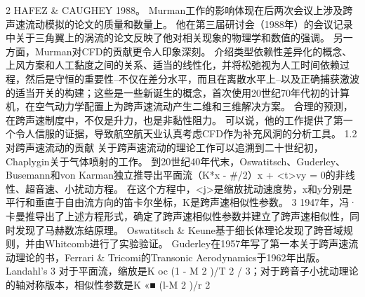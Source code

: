\documentclass[UTF8,11pt,a4paper,openany,fontset=fandol]{ctexbook}
\begin{document}
2 HAFEZ \& CAUGHEY 1988。 Murman工作的影响体现在后两次会议上涉及跨声速流动模拟的论文的质量和数量上。 他在第三届研讨会（1988年）的会议记录中关于三角翼上的涡流的论文反映了他对相关现象的物理学和数值的强调。 另一方面，Murman对CFD的贡献更令人印象深刻。 介绍类型依赖性差异化的概念、上风方案和人工黏度之间的关系、适当的线性化，并将松弛视为人工时间依赖过程，然后是守恒的重要性--不仅在差分水平，而且在离散水平上--以及正确捕获激波的适当开关的构建；这些是一些新诞生的概念，首次使用20世纪70年代初的计算机，在空气动力学配置上为跨声速流动产生二维和三维解决方案。 合理的预测，在跨声速制度中，不仅是升力，也是非黏性阻力。 可以说，他的工作提供了第一个令人信服的证据，导致航空航天业认真考虑CFD作为补充风洞的分析工具。 1.2 对跨声速流动的贡献 关于跨声速流动的理论工作可以追溯到二十世纪初，Chaplygin关于气体喷射的工作。 到20世纪40年代末，Oswatitsch、Guderley、Busemann和von Karman独立推导出平面流（K*x - \#/2）x + <t>vy = 0的非线性、超音速、小扰动方程。 在这个方程中，<j>是缩放扰动速度势，x和y分别是平行和垂直于自由流方向的笛卡尔坐标，K是跨声速相似性参数。 3 1947年，冯·卡曼推导出了上述方程形式，确定了跨声速相似性参数并建立了跨声速相似性，同时发现了马赫数冻结原理。 Oswatitsch \& Keune基于细长体理论发现了跨音域规则，并由Whitcomb进行了实验验证。 Guderley在1957年写了第一本关于跨声速流动理论的书，Ferrari \& Tricomi的Transonic Aerodynamics于1962年出版。 Landahl's 3 对于平面流，缩放是K oc (1 - M 2 )/T 2 / 3；对于跨音子小扰动理论的轴对称版本，相似性参数是K «■ (l-M 2 )/r 2
\end{document}
